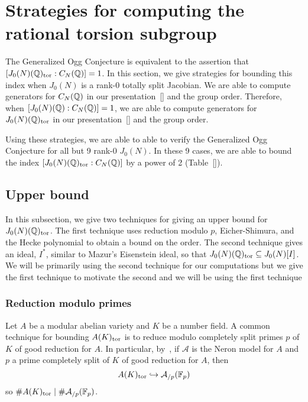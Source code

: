 \section{Strategies for computing the rational torsion subgroup}
\label{sec:strategies_for_rational_torsion}

The Generalized Ogg Conjecture is equivalent to the assertion that
$[J_0(N)(\mathbb{Q})_{\mathrm{tor}}:C_N(\mathbb{Q})]=1$. In this section, we give strategies for
bounding this index when $J_0(N)$ is a rank-0 totally split Jacobian. We are
able to compute generators for $C_N(\mathbb{Q})$ in our presentation~\ref{} and the
group order. Therefore, when $[J_0(N)(\mathbb{Q}):C_N(\mathbb{Q})]=1$, we are able to compute
generators for $J_0(N)(\mathbb{Q})_{\mathrm{tor}}$ in our presentation~\ref{} and the group
order.

Using these strategies, we are able to able to verify the Generalized Ogg
Conjecture for all but 9 rank-0 $J_0(N)$. In these 9 cases, we are
able to bound the index $[J_0(N)(\mathbb{Q})_{\mathrm{tor}}:C_N(\mathbb{Q})]$ by a power of 2
(Table~\ref{}).

\subsection{Upper bound}%
\label{sub:upper_bound}

In this subsection, we give two techniques for giving an upper bound for
$J_0(N)(\mathbb{Q})_{\mathrm{tor}}$. The first technique uses reduction modulo $p$,
Eicher-Shimura, and the Hecke polynomial to obtain a bound on the order. The
second technique gives an ideal, $I^*$, similar to Mazur's Eisenstein ideal, so
that $J_0(N)(\mathbb{Q})_{\mathrm{tor}}\subseteq J_0(N)[I]$. We will be primarily using the
second technique for our computations but we give the first technique to
motivate the second and we will be using the first technique

\subsubsection{Reduction modulo primes}%
\label{ssub:reduction_modulo_primes}
Let $A$ be a modular abelian variety and $K$ be a number field. A common
technique for bounding $A(K)_{\mathrm{tor}}$ is to reduce modulo completely split primes
$p$ of $K$ of good reduction for $A$. In particular,
by~\cite[Appendix]{katz:torsion}, if $\mathcal{A}$ is the Neron model for $A$
and $p$ a prime completely split of $K$ of good reduction for $A$, then
\[
    A(K)_{\mathrm{tor}} \hookrightarrow \mathcal{A}_{/p}(\mathbb{F}_p)
\]
so $\# A(K)_{\mathrm{tor}} \mid \#\mathcal{A}_{/p}(\mathbb{F}_p)$.

